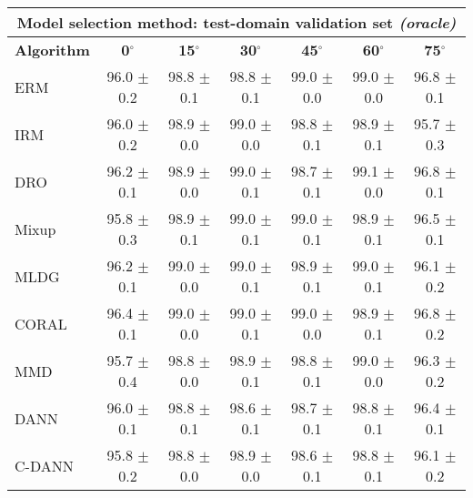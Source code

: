 \documentclass{article}
\begin{document}
\begin{center}
\begin{tabular}{lcccccc}
\toprule
\multicolumn{7}{c}{\textbf{Model selection method: test-domain validation set \textit{(oracle)}}} \\
\midrule
\textbf{Algorithm}    & \textbf{0$^{\circ}$}      & \textbf{15$^{\circ}$}     & \textbf{30$^{\circ}$}     & \textbf{45$^{\circ}$}     & \textbf{60$^{\circ}$}     & \textbf{75$^{\circ}$}     \\
\midrule
ERM                       & 96.0 $\pm$ 0.2            & 98.8 $\pm$ 0.1            & 98.8 $\pm$ 0.1            & 99.0 $\pm$ 0.0            & 99.0 $\pm$ 0.0            & 96.8 $\pm$ 0.1            \\
IRM                       & 96.0 $\pm$ 0.2            & 98.9 $\pm$ 0.0            & 99.0 $\pm$ 0.0            & 98.8 $\pm$ 0.1            & 98.9 $\pm$ 0.1            & 95.7 $\pm$ 0.3            \\
DRO                 & 96.2 $\pm$ 0.1            & 98.9 $\pm$ 0.0            & 99.0 $\pm$ 0.1            & 98.7 $\pm$ 0.1            & 99.1 $\pm$ 0.0            & 96.8 $\pm$ 0.1            \\
Mixup                     & 95.8 $\pm$ 0.3            & 98.9 $\pm$ 0.1            & 99.0 $\pm$ 0.1            & 99.0 $\pm$ 0.1            & 98.9 $\pm$ 0.1            & 96.5 $\pm$ 0.1            \\
MLDG                      & 96.2 $\pm$ 0.1            & 99.0 $\pm$ 0.0            & 99.0 $\pm$ 0.1            & 98.9 $\pm$ 0.1            & 99.0 $\pm$ 0.1            & 96.1 $\pm$ 0.2            \\
CORAL                     & 96.4 $\pm$ 0.1            & 99.0 $\pm$ 0.0            & 99.0 $\pm$ 0.1            & 99.0 $\pm$ 0.0            & 98.9 $\pm$ 0.1            & 96.8 $\pm$ 0.2            \\
MMD                       & 95.7 $\pm$ 0.4            & 98.8 $\pm$ 0.0            & 98.9 $\pm$ 0.1            & 98.8 $\pm$ 0.1            & 99.0 $\pm$ 0.0            & 96.3 $\pm$ 0.2            \\
DANN                       & 96.0 $\pm$ 0.1            & 98.8 $\pm$ 0.1            & 98.6 $\pm$ 0.1            & 98.7 $\pm$ 0.1            & 98.8 $\pm$ 0.1            & 96.4 $\pm$ 0.1            \\
C-DANN                   & 95.8 $\pm$ 0.2            & 98.8 $\pm$ 0.0            & 98.9 $\pm$ 0.0            & 98.6 $\pm$ 0.1            & 98.8 $\pm$ 0.1            & 96.1 $\pm$ 0.2            \\
\bottomrule
\end{tabular}
\end{center}
\end{document}
